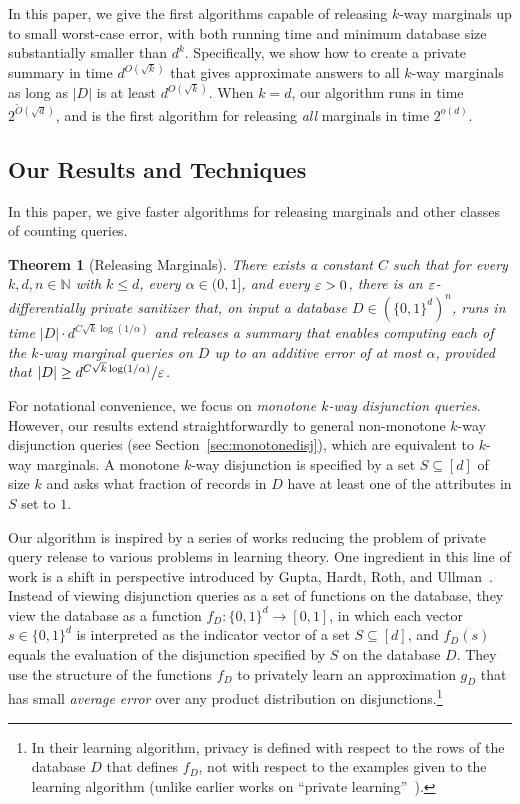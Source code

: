 \documentclass[11pt]{article}
\newcommand\N{\mathbb{N}}
\newcommand\bits{\{0,1\}}
\newcommand\from{\colon}
\newtheorem{theorem}{Theorem}[section]
\theoremstyle{definition}
\begin{document}
In this paper, we give the first algorithms capable of releasing $k$-way marginals up to small worst-case error, with both running time and minimum database size substantially smaller than $d^{k}$.  Specifically, we show how to create a private summary in time $d^{O(\sqrt{k})}$ that gives approximate answers to all $k$-way marginals as long as $|D|$ is at least $d^{O(\sqrt{k})}$.  When $k=d$, our algorithm runs in time $2^{\tilde{O}(\sqrt{d})}$, and is the first algorithm for releasing \emph{all} marginals in time $2^{o(d)}$.

\subsection{Our Results and Techniques}

In this paper, we give faster algorithms for releasing marginals and other classes of counting queries.

\begin{theorem}[Releasing Marginals] \label{thm:main1}
There exists a constant $C$ such that for every $k, d, n \in \N$ with $k \leq d$, every $\alpha \in (0,1]$, and every $\varepsilon > 0$, there is an $\varepsilon$-differentially private sanitizer that, on input a database $D \in (\bits^d)^n$, runs in time $|D| \cdot d^{C\sqrt{k} \log(1/\alpha)}$ and releases a summary that enables computing each of the $k$-way marginal queries on $D$ up to an additive error of at most $\alpha$, provided that $|D| \geq d^{C\sqrt{k} \log(1/\alpha)}/\varepsilon$.\end{theorem}

For notational convenience, we focus on \emph{monotone $k$-way disjunction queries}. However, our results extend straightforwardly to general non-monotone $k$-way disjunction queries (see Section~\ref{sec:monotonedisj}), which are equivalent to $k$-way marginals.  A monotone $k$-way disjunction is specified by a set $S \subseteq [d]$ of size $k$ and asks what fraction of records in $D$ have at least one of the attributes in $S$ set to $1$.  

Our algorithm is inspired by a series of works reducing the problem of private query release to various problems in learning theory.  
One ingredient in this line of work is a shift in perspective introduced by Gupta, Hardt, Roth, and Ullman~\cite{GuptaHaRoUl11}. 
Instead of viewing disjunction queries as a set of functions on the database, they view the database as a function $f_D\from \bits^d \to [0,1]$, in which each vector $s \in \bits^d$ is interpreted as the indicator vector of a set $S \subseteq [d]$, and $f_D(s)$ equals the evaluation of the disjunction specified by $S$ on the database $D$.  They use the structure of the functions $f_D$ to privately learn an approximation $g_D$ that has small \emph{average error} over any product distribution on disjunctions.\footnote{In their learning algorithm, privacy is defined with respect to the rows of the database $D$ that defines $f_{D}$, not with respect to the examples given to the learning algorithm (unlike earlier works on ``private learning''~\cite{KasiviswanathanLeNiRaSm07}). }
\end{document}
